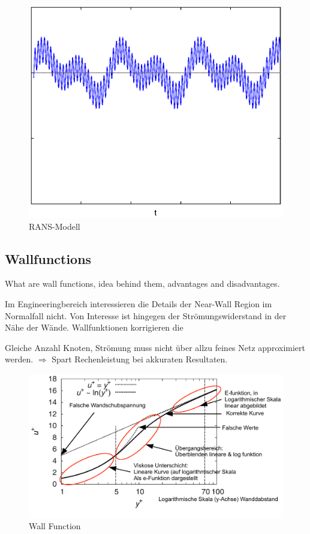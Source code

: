 \documentclass[a4paper]{scrartcl}
\begin{document}
\begin{figure}[h!]
\begin{center}
\includegraphics[scale=0.5]{images/RANS.eps}
\caption{RANS-Modell}
\label{}
\end{center}
\end{figure}



\subsection{Wallfunctions} 
What are wall functions, idea behind them, advantages
and disadvantages.

Im Engineeringbereich interessieren die Details der Near-Wall Region im
Normalfall nicht. Von Interesse ist hingegen der Strömungswiderstand in der Nähe
der Wände. Wallfunktionen korrigieren die

Gleiche Anzahl Knoten, Strömung muss nicht über allzu feines Netz approximiert
werden. $\Rightarrow$ Spart Rechenleistung bei akkuraten Resultaten.\\
\begin{figure}[h!]
\begin{center}
\includegraphics[scale=0.8]{images/wall_function.pdf}
\caption{Wall Function}
\label{fig:Wall}
\end{center}
\end{figure}
\end{document}
